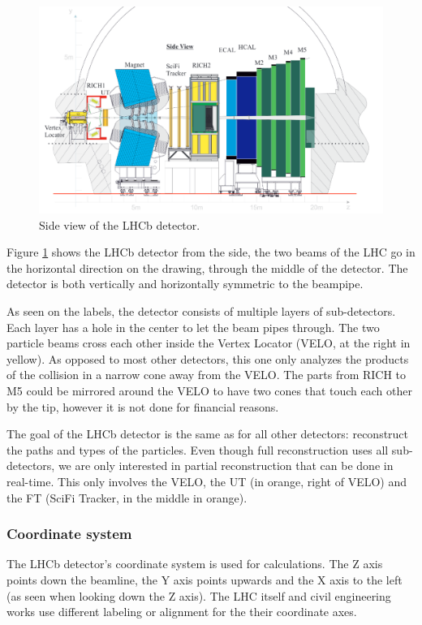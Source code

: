 \documentclass[12pt]{article}
\begin{document}
\begin{figure}[H]
	\includegraphics[width=\textwidth]{lhcb_geometry_upgrade}
	\caption{Side view of the LHCb detector.}
	\label{fig_lhcb_geometry}
\end{figure}

Figure \ref{fig_lhcb_geometry} shows the LHCb detector from the side, the two beams of the LHC go in the horizontal direction on the drawing, through the middle of the detector. The detector is both vertically and horizontally symmetric to the beampipe.

As seen on the labels, the detector consists of multiple layers of sub-detectors. Each layer has a hole in the center to let the beam pipes through. The two particle beams cross each other inside the Vertex Locator (VELO, at the right in yellow). As opposed to most other detectors, this one only analyzes the products of the collision in a narrow cone away from the VELO. The parts from RICH to M5 could be mirrored around the VELO to have two cones that touch each other by the tip, however it is not done for financial reasons.

The goal of the LHCb detector is the same as for all other detectors: reconstruct the paths and types of the particles. Even though full reconstruction uses all sub-detectors, we are only interested in partial reconstruction that can be done in real-time. This only involves the VELO, the UT (in orange, right of VELO) and the FT (SciFi Tracker, in the middle in orange).


\subsubsection{Coordinate system}\label{sec_coordinate_system}

The LHCb detector's coordinate system is used for calculations. The Z axis points down the beamline, the Y axis points upwards and the X axis to the left (as seen when looking down the Z axis). The LHC itself and civil engineering works use different labeling or alignment for the their coordinate axes.
\end{document}
